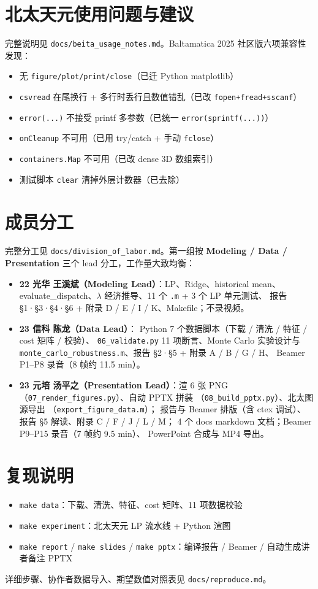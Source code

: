 \documentclass[12pt,a4paper]{article}
\begin{document}
\section{北太天元使用问题与建议}\label{app:beita-quirks}
完整说明见 \verb|docs/beita_usage_notes.md|。Baltamatica 2025 社区版六项兼容性发现：
\begin{itemize}\small
\item 无 \verb|figure/plot/print/close|（已迁 Python matplotlib）
\item \verb|csvread| 在尾换行 + 多行时丢行且数值错乱（已改 \verb|fopen+fread+sscanf|）
\item \verb|error(...)| 不接受 printf 多参数（已统一 \verb|error(sprintf(...))|）
\item \verb|onCleanup| 不可用（已用 try/catch + 手动 \verb|fclose|）
\item \verb|containers.Map| 不可用（已改 dense 3D 数组索引）
\item 测试脚本 \verb|clear| 清掉外层计数器（已去除）
\end{itemize}

\section{成员分工}\label{app:roles}
完整分工见 \verb|docs/division_of_labor.md|。第一组按
\textbf{Modeling / Data / Presentation} 三个 lead 分工，工作量大致均衡：
\begin{itemize}\small
\item \textbf{22 光华 王溪斌（Modeling Lead）}：LP、Ridge、historical mean、
evaluate\_dispatch、$\lambda$ 经济推导、11 个 \verb|.m| + 3 个 LP 单元测试、
报告 §1·§3·§4·§6 + 附录 D / E / I / K、Makefile；不录视频。
\item \textbf{23 信科 陈龙（Data Lead）}：
Python 7 个数据脚本（下载 / 清洗 / 特征 / cost 矩阵 / 校验）、
\verb|06_validate.py| 11 项断言、Monte Carlo 实验设计与
\verb|monte_carlo_robustness.m|、报告 §2·§5 + 附录 A / B / G / H、
Beamer P1--P8 录音（8 帧约 11.5 min）。
\item \textbf{23 元培 汤平之（Presentation Lead）}：渲 6 张 PNG
（\texttt{07\_render\_figures.py}）、自动 PPTX 拼装
（\texttt{08\_build\_pptx.py}）、北太图源导出
（\texttt{export\_figure\_data.m}）；
报告与 Beamer 排版（含 ctex 调试）、报告 §5 解读、附录 C / F / J / L / M；
4 个 docs markdown 文档；Beamer P9--P15 录音（7 帧约 9.5 min）、
PowerPoint 合成与 MP4 导出。
\end{itemize}

\section{复现说明}\label{app:reproduce}
\begin{itemize}\small
\item \verb|make data|：下载、清洗、特征、cost 矩阵、11 项数据校验
\item \verb|make experiment|：北太天元 LP 流水线 + Python 渲图
\item \verb|make report| / \verb|make slides| / \verb|make pptx|：编译报告 / Beamer / 自动生成讲者备注 PPTX
\end{itemize}
详细步骤、协作者数据导入、期望数值对照表见 \verb|docs/reproduce.md|。
\end{document}

